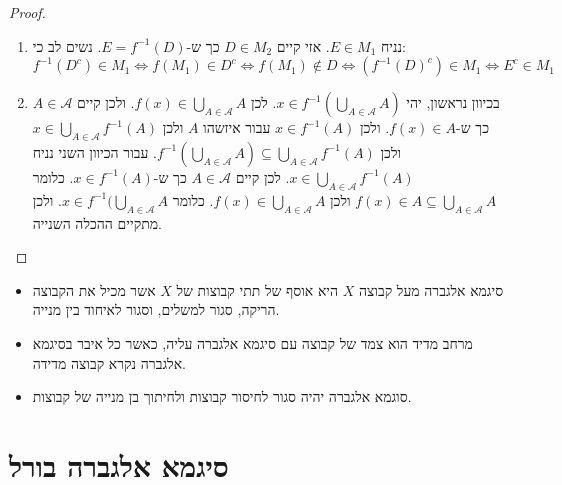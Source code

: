 \documentclass{tstextbook}
\begin{document}
\begin{proof}
  \begin{enumerate}
    \item נניח \(E \in M_{1}\). אזי קיים \(D \in M_{2}\) כך ש-\(E =f^{-1}(D)\). נשים לב כי: 
$$f^{-1}(D^{c})\in M_{1}\iff f(M_{1})\in D^{c}\iff f(M_{1})\not  \in D \iff \left( f^{-1}(D)^{c} \right)\in M_{1}\iff E^{c} \in M_{1}$$


    \item בכיוון נראשון, יהי \(x \in f^{-1}\left( \bigcup_{A \in \mathcal{A}}A \right)\). לכן \(f(x)\in \bigcup_{A \in \mathcal{A}}A\). ולכן קיים \(A \in \mathcal{A}\) כך ש-\(f(x) \in A\). ולכן \(x \in f^{-1}(A)\) עבור איזשהו \(A\) ולכן \(x \in \bigcup_{A\in\mathcal{A}}f^{-1}(A)\) ולכן \(f^{-1}\left( \bigcup_{A \in \mathcal{A}}A \right)\subseteq \bigcup_{A \in \mathcal{A}}f^{-1}(A)\). עבור הכיוון השני נניח \(x \in \bigcup_{A \in \mathcal{A}}f^{-1}(A)\). לכן קיים \(A \in \mathcal{A}\) כך ש-\(x \in f^{-1}(A)\). כלומר \(f(x)\in A\subseteq \bigcup_{A \in \mathcal{A}}A\) ולכן \(f(x)\in \bigcup_{A \in \mathcal{A}}A\). כלומר \(x \in f^{-1}(\bigcup_{A \in \mathcal{A}}A\). ולכן מתקיים ההכלה השנייה. 


  \end{enumerate}
\end{proof}
\begin{summary}
  \begin{itemize}
    \item סיגמא אלגברה מעל קבוצה \(X\) היא אוסף של תתי קבוצות של \(X\) אשר מכיל את הקבוצה הריקה, סגור למשלים, וסגור לאיחוד בין מנייה.
    \item מרחב מדיד הוא צמד של קבוצה עם סיגמא אלגברה עליה, כאשר כל איבר בסיגמא אלגברה נקרא קבוצה מדידה.
    \item סוגמא אלגברה יהיה סגור לחיסור קבוצות ולחיתוך בן מנייה של קבוצות.
  \end{itemize}
\end{summary}
\section{סיגמא אלגברה בורל}
\end{document}
